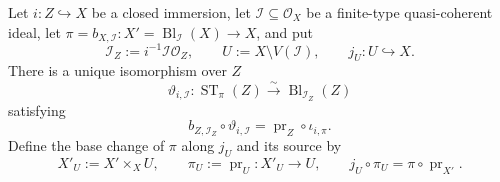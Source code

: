 \begin{lemma}
  \label{lemma:nagata-strict-transform-ambient-closed}

  Let $i\colon Z\hookrightarrow X$ be a closed immersion, let
  $\mathcal I\subseteq\mathcal O_X$ be a finite-type quasi-coherent ideal,
  let
  $\pi=b_{X,\mathcal I}\colon X'=\operatorname{Bl}_{\mathcal I}(X)\to X$,
  and put
  \[
    \mathcal I_Z:=i^{-1}\mathcal I\mathcal O_Z,\qquad
    U:=X\setminus V(\mathcal I),\qquad
    j_U\colon U\hookrightarrow X.                               \tag{AC1}
  \]
  There is a unique
  isomorphism over $Z$
  \[
    \vartheta_{i,\mathcal I}\colon
      \operatorname{ST}_\pi(Z)\xrightarrow{\sim}
      \operatorname{Bl}_{\mathcal I_Z}(Z)
  \]
  satisfying
  \[
    b_{Z,\mathcal I_Z}\circ\vartheta_{i,\mathcal I}
      =\operatorname{pr}_Z\circ\iota_{i,\pi}.
  \]
  Define the base change of $\pi$ along $j_U$ and its source by
  \[
    X'_U:=X'\times_XU,
    \qquad
    \pi_U:=\operatorname{pr}_U\colon X'_U\longrightarrow U,
    \qquad
    j_U\circ\pi_U=\pi\circ\operatorname{pr}_{X'}.
  \]
  

\end{lemma}
